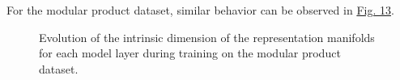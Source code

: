 For the modular product dataset, similar behavior can be observed in \hyperref[fig:IntrinsicDimensionEvolutionProd]{Fig. 13}.

\begin{figure}[H]
    \centering
     
     
     
    \caption[Intrinsic dimension evolution (Modular Product).]{Evolution of the intrinsic dimension of the representation manifolds for each model layer during training on the modular product dataset.}
    \label{fig:IntrinsicDimensionEvolutionProd}
\end{figure}